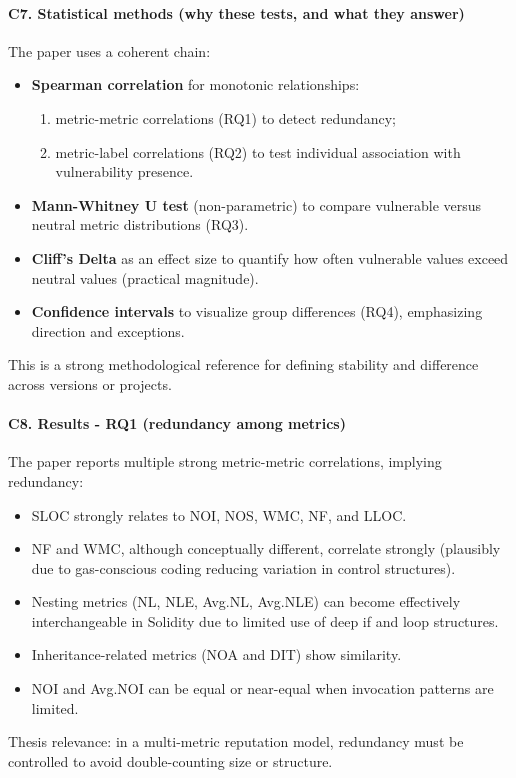 \documentclass[11pt,a4paper]{article}
\begin{document}
\paragraph{C7. Statistical methods (why these tests, and what they answer)}
The paper uses a coherent chain:
\begin{itemize}[leftmargin=*]
  \item \textbf{Spearman correlation} for monotonic relationships:
  \begin{enumerate}[leftmargin=*]
    \item metric-metric correlations (RQ1) to detect redundancy;
    \item metric-label correlations (RQ2) to test individual association with vulnerability presence.
  \end{enumerate}
  \item \textbf{Mann-Whitney U test} (non-parametric) to compare vulnerable versus neutral metric distributions (RQ3).
  \item \textbf{Cliff's Delta} as an effect size to quantify how often vulnerable values exceed neutral values (practical magnitude).
  \item \textbf{Confidence intervals} to visualize group differences (RQ4), emphasizing direction and exceptions.
\end{itemize}
This is a strong methodological reference for defining stability and difference across versions or projects.

\paragraph{C8. Results - RQ1 (redundancy among metrics)}
The paper reports multiple strong metric-metric correlations, implying redundancy:
\begin{itemize}[leftmargin=*]
  \item SLOC strongly relates to NOI, NOS, WMC, NF, and LLOC.
  \item NF and WMC, although conceptually different, correlate strongly (plausibly due to gas-conscious coding reducing variation in control structures).
  \item Nesting metrics (NL, NLE, Avg.NL, Avg.NLE) can become effectively interchangeable in Solidity due to limited use of deep if and loop structures.
  \item Inheritance-related metrics (NOA and DIT) show similarity.
  \item NOI and Avg.NOI can be equal or near-equal when invocation patterns are limited.
\end{itemize}
Thesis relevance: in a multi-metric reputation model, redundancy must be controlled to avoid double-counting size or structure.
\end{document}
